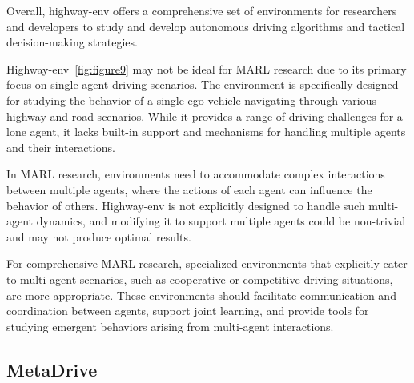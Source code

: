Overall, highway-env offers a comprehensive set of environments for researchers and developers to study and develop autonomous driving algorithms and tactical decision-making strategies.

Highway-env~\cref{fig:figure9} may not be ideal for MARL research due to its primary focus on single-agent driving scenarios. The environment is specifically designed for studying the behavior of a single ego-vehicle navigating through various highway and road scenarios. While it provides a range of driving challenges for a lone agent, it lacks built-in support and mechanisms for handling multiple agents and their interactions.

In MARL research, environments need to accommodate complex interactions between multiple agents, where the actions of each agent can influence the behavior of others. Highway-env is not explicitly designed to handle such multi-agent dynamics, and modifying it to support multiple agents could be non-trivial and may not produce optimal results.

For comprehensive MARL research, specialized environments that explicitly cater to multi-agent scenarios, such as cooperative or competitive driving situations, are more appropriate. These environments should facilitate communication and coordination between agents, support joint learning, and provide tools for studying emergent behaviors arising from multi-agent interactions.

\subsection{MetaDrive}\label{subsec:metadrive}
